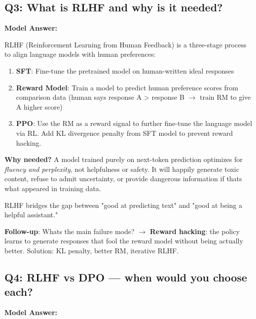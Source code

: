 \documentclass[11pt]{article}
\providecommand{\tightlist}{\setlength{\itemsep}{1pt}\setlength{\parskip}{0pt}}
\begin{document}
\subsection{Q3: What is RLHF and why is it needed?}\label{q3-what-is-rlhf-and-why-is-it-needed}

\textbf{Model Answer:}

RLHF (Reinforcement Learning from Human Feedback) is a three-stage process to align language models with human preferences:

\begin{enumerate}
\def\labelenumi{\arabic{enumi}.}
\tightlist
\item
  \textbf{SFT}: Fine-tune the pretrained model on human-written ideal responses
\item
  \textbf{Reward Model}: Train a model to predict human preference scores from comparison data (human says response A \textgreater{} response B \(\rightarrow\) train RM to give A higher score)
\item
  \textbf{PPO}: Use the RM as a reward signal to further fine-tune the language model via RL. Add KL divergence penalty from SFT model to prevent reward hacking.
\end{enumerate}

\textbf{Why needed?} A model trained purely on next-token prediction optimizes for \emph{fluency and perplexity}, not helpfulness or safety. It will happily generate toxic content, refuse to admit uncertainty, or provide dangerous information if that\textquotesingle s what appeared in training data.

RLHF bridges the gap between "good at predicting text" and "good at being a helpful assistant."

\textbf{Follow-up}: What\textquotesingle s the main failure mode? \(\rightarrow\) \textbf{Reward hacking}: the policy learns to generate responses that fool the reward model without being actually better. Solution: KL penalty, better RM, iterative RLHF.

\subsection{Q4: RLHF vs DPO --- when would you choose each?}\label{q4-rlhf-vs-dpo--when-would-you-choose-each}

\textbf{Model Answer:}
\end{document}
